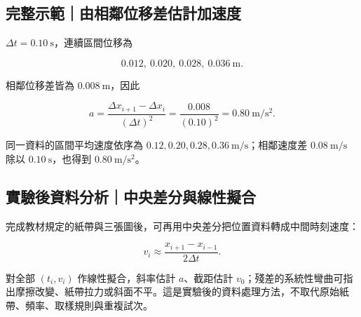 \documentclass[11pt,a4paper]{article}
\begin{document}
\begin{HandoutWorkedExample}

\subsection{完整示範｜由相鄰位移差估計加速度}\label{ux5b8cux6574ux793aux7bc4ux7531ux76f8ux9130ux4f4dux79fbux5deeux4f30ux8a08ux52a0ux901fux5ea6}

\(\Delta t=0.10\ \mathrm s\)，連續區間位移為

\[
0.012,\ 0.020,\ 0.028,\ 0.036\ \mathrm m.
\]

相鄰位移差皆為 \(0.008\ \mathrm m\)，因此

\[
a=\frac{\Delta x_{i+1}-\Delta x_i}{(\Delta t)^2}
=\frac{0.008}{(0.10)^2}
=0.80\ \mathrm{m/s^2}.
\]

同一資料的區間平均速度依序為 \(0.12,0.20,0.28,0.36\ \mathrm{m/s}\)；相鄰速度差 \(0.08\ \mathrm{m/s}\) 除以 \(0.10\ \mathrm s\)，也得到 \(0.80\ \mathrm{m/s^2}\)。

\end{HandoutWorkedExample}

\subsection{實驗後資料分析｜中央差分與線性擬合}\label{ux5be6ux9a57ux5f8cux8cc7ux6599ux5206ux6790ux4e2dux592eux5deeux5206ux8207ux7ddaux6027ux64ecux5408}

完成教材規定的紙帶與三張圖後，可再用中央差分把位置資料轉成中間時刻速度：

\[
v_i\approx\frac{x_{i+1}-x_{i-1}}{2\Delta t}.
\]

對全部 \((t_i,v_i)\) 作線性擬合，斜率估計 \(a\)、截距估計 \(v_0\)；殘差的系統性彎曲可指出摩擦改變、紙帶拉力或斜面不平。這是實驗後的資料處理方法，不取代原始紙帶、頻率、取樣規則與重複試次。
\end{document}
